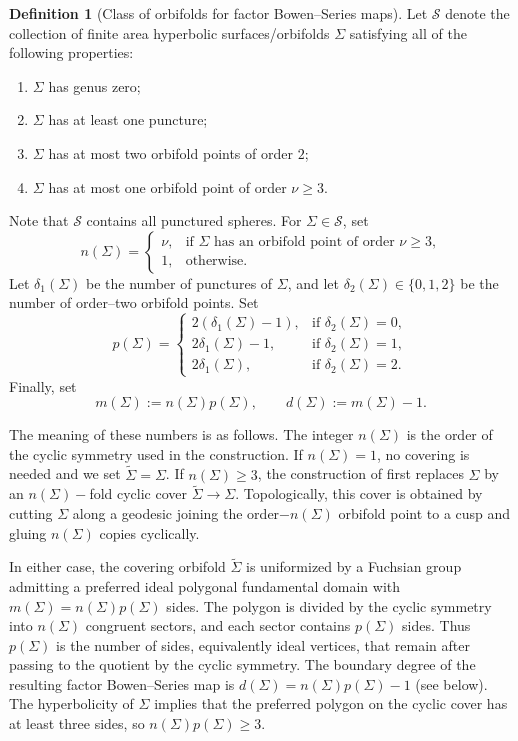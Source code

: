 \documentclass[11pt,a4paper, oneside]{amsart}
\theoremstyle{definition}
\newtheorem{defn}[thm]{Definition}
\theoremstyle{remark}
\numberwithin{equation}{section}
\renewcommand{\ge}{\geqslant}
\begin{document}
\begin{defn}[Class of orbifolds for factor Bowen--Series maps]
	\label{Def:OrbifoldClassForFBS}
	Let $\mathscr S$ denote the collection of finite area hyperbolic surfaces/orbifolds $\Sigma$
	satisfying all of the following properties:
	\begin{enumerate}
		\item $\Sigma$ has genus zero;
		\item $\Sigma$ has at least one puncture;
		\item $\Sigma$ has at most two orbifold points of order $2$;
		\item $\Sigma$ has at most one orbifold point of order $\nu\ge3$.
	\end{enumerate}
Note that $\mathscr{S}$ contains all punctured spheres.
	For $\Sigma\in\mathscr S$, set
	\[
	n(\Sigma)=
	\begin{cases}
		\nu, & \text{if $\Sigma$ has an orbifold point of order $\nu\ge3$,}\\
		1, & \text{otherwise.}
	\end{cases}
	\]
	Let $\delta_1(\Sigma)$ be the number of punctures of $\Sigma$, and let
	$\delta_2(\Sigma)\in\{0,1,2\}$ be the number of order--two orbifold points.  Set
	\[
	p(\Sigma)=
	\begin{cases}
		2(\delta_1(\Sigma)-1), & \text{if } \delta_2(\Sigma)=0,\\
		2\delta_1(\Sigma)-1, & \text{if } \delta_2(\Sigma)=1,\\
        2\delta_1(\Sigma), & \text{if } \delta_2(\Sigma)=2.
	\end{cases}
	\]
	Finally, set
	\[
	m(\Sigma):=n(\Sigma)p(\Sigma),
	\qquad
	d(\Sigma):=m(\Sigma)-1.
	\]
\end{defn}

The meaning of these numbers is as follows.  The integer $n(\Sigma)$ is the
order of the cyclic symmetry used in the construction.  If $n(\Sigma)=1$, no
covering is needed and we set $\widetilde\Sigma=\Sigma$.  If $n(\Sigma)\ge3$,
the construction of \cite[\S13]{LLM24} first replaces $\Sigma$ by an
$n(\Sigma)-$fold cyclic cover
$\widetilde\Sigma\to\Sigma$.  Topologically, this cover is obtained by cutting
$\Sigma$ along a geodesic joining the order$-n(\Sigma)$ orbifold point to a cusp
and gluing $n(\Sigma)$ copies cyclically.

In either case, the covering orbifold $\widetilde\Sigma$ is uniformized by a
Fuchsian group admitting a preferred ideal polygonal fundamental domain with
$m(\Sigma)=n(\Sigma)p(\Sigma)$ sides.  The polygon is divided by the cyclic
symmetry into $n(\Sigma)$ congruent sectors, and each sector contains
$p(\Sigma)$ sides.  Thus $p(\Sigma)$ is the number of sides, equivalently ideal
vertices, that remain after passing to the quotient by the cyclic symmetry.  The
boundary degree of the resulting factor Bowen--Series map is
$d(\Sigma)=n(\Sigma)p(\Sigma)-1$ (see below). The hyperbolicity of $\Sigma$ implies that the preferred polygon on the cyclic cover has at least three sides,
so $n(\Sigma)p(\Sigma)\ge3$.
\end{document}

